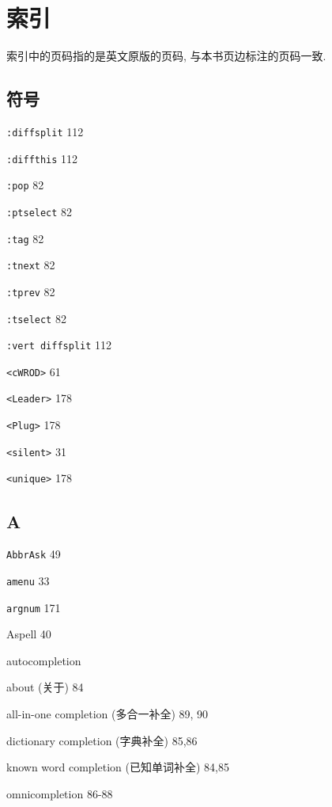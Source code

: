 \chapter{索引}
\label{chap:index}

索引中的页码指的是英文原版的页码, 与本书页边标注的页码一致.

\begin{multicols}{2}

\hangindent=3pc  \section*{符号}

\hangindent=3pc  \texttt{:diffsplit} 112

\hangindent=3pc  \texttt{:diffthis} 112

\hangindent=3pc  \texttt{:pop} 82

\hangindent=3pc  \texttt{:ptselect} 82

\hangindent=3pc  \texttt{:tag} 82

\hangindent=3pc  \texttt{:tnext} 82

\hangindent=3pc  \texttt{:tprev} 82

\hangindent=3pc  \texttt{:tselect} 82

\hangindent=3pc  \texttt{:vert diffsplit} 112

\hangindent=3pc  \texttt{<cWROD>} 61

\hangindent=3pc  \texttt{<Leader>} 178

\hangindent=3pc  \texttt{<Plug>} 178

\hangindent=3pc  \texttt{<silent>} 31

\hangindent=3pc  \texttt{<unique>} 178

\hangindent=3pc  \section*{A}

\hangindent=3pc  \texttt{AbbrAsk} 49

\hangindent=3pc  \texttt{amenu} 33

\hangindent=3pc  \texttt{argnum} 171

\hangindent=3pc  Aspell 40

\hangindent=3pc  autocompletion \par
\hangindent=3pc \quad about (关于) 84 \par
\hangindent=3pc \quad all-in-one completion (多合一补全) 89, 90 \par
\hangindent=3pc \quad dictionary completion (字典补全) 85,86 \par
\hangindent=3pc \quad known word completion (已知单词补全) 84,85 \par
\hangindent=3pc \quad omnicompletion 86-88 \par


\end{multicols}
